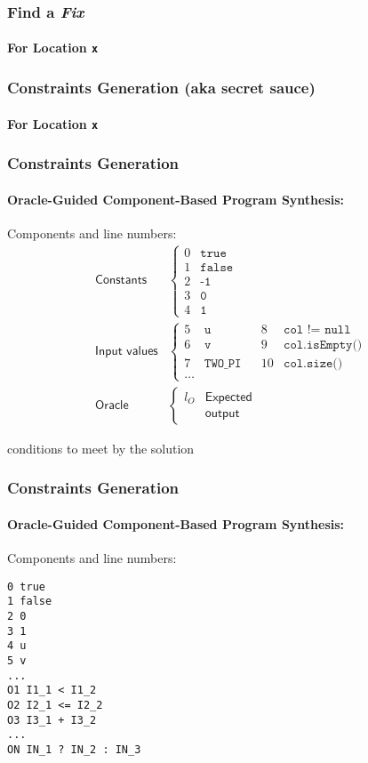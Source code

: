\frame
{
  \frametitle{Find a \textit{Fix}}
  \framesubtitle{For Location \texttt{x}}
  \begin{center}
  
  \end{center}
}

\frame
{
  \frametitle{Constraints Generation (aka secret sauce)}
  \framesubtitle{For Location \texttt{x}}
  \begin{center}
  
  \end{center}
}

\begin{frame}
  \frametitle{Constraints Generation}
  \framesubtitle{Oracle-Guided Component-Based Program Synthesis:}
  Components and line numbers:
\begin{align*}
\textsf{Constants} & \left\{ \begin{array}{ll}
        0 & \texttt{true} \\
        1 & \texttt{false} \\
        2 & \texttt{-1} \\
        3 & \texttt{0} \\
        4 & \texttt{1}
    \end{array}\right. \\
\textsf{Input values} & \left\{ \begin{array}{lllll}
        5 & \texttt{u} & &		8 & \texttt{col != null} \\
        6 & \texttt{v} & &		9 & \texttt{col.isEmpty()} \\
        7 & \texttt{TWO\_PI} & &	10 & \texttt{col.size()} \\
        \dots
    \end{array}\right. \\
\textsf{Oracle} & \left\{ \begin{array}{ll}
        l_O &  \textsf{Expected} \\
            & \textsf{output}
    \end{array}\right.
\end{align*}
\end{frame}

\begin{frame}
conditions to meet by the solution
\end{frame}

\begin{frame}[fragile]
  \frametitle{Constraints Generation}
  \framesubtitle{Oracle-Guided Component-Based Program Synthesis:}
  Components and line numbers:
\begin{verbatim}
0 true
1 false
2 0
3 1
4 u
5 v
...
O1 I1_1 < I1_2
O2 I2_1 <= I2_2
O3 I3_1 + I3_2
...
ON IN_1 ? IN_2 : IN_3
\end{verbatim}
\end{frame}

